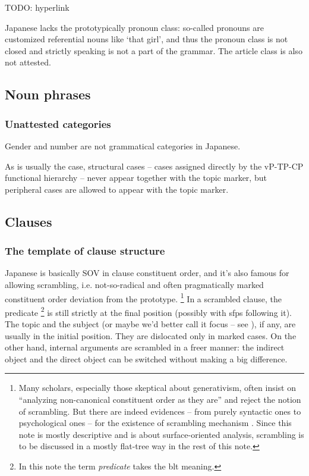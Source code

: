 \documentclass[UTF8, a4paper, oneside, scheme=plain]{ctexart}
\newcommand*{\term}[1]{\emph{#1}}
\newcommand{\translate}[1]{`#1'}
\begin{document}
TODO: hyperlink

Japanese lacks the prototypically pronoun class:
so-called pronouns are customized referential nouns like \translate{that girl},
and thus the pronoun class is not closed and strictly speaking is not a part of the grammar.
The article class is also not attested.

\subsection{Noun phrases}

\subsubsection{Unattested categories}

Gender and number are not grammatical categories in Japanese.



As is usually the case,
structural cases -- cases assigned directly by the vP-TP-CP functional hierarchy 
-- never appear together with the topic marker,
but peripheral cases are allowed to appear with the topic marker.

\subsection{Clauses}

\subsubsection{The template of clause structure}

Japanese is basically SOV in clause constituent order,
and it's also famous for allowing scrambling,
i.e. not-so-radical and often pragmatically marked constituent order deviation from the prototype.%
\footnote{
    Many scholars, especially those skeptical about generativism,
    often insist on ``analyzing non-canonical constituent order as they are''
    and reject the notion of scrambling.
    But there are indeed evidences -- from purely syntactic ones to psychological ones -- 
    for the existence of scrambling mechanism \citep{imamura2015effects,imamura2016processing,yatsushiro2003vp}.
    Since this note is mostly descriptive and is about surface-oriented analysis,
    scrambling is to be discussed in a mostly flat-tree way in the rest of this note.
}
In a scrambled clause, 
the predicate%
\footnote{
    In this note the term \term{predicate} takes the \ac{blt} meaning.
}
is still strictly at the final position 
(possibly with \acs{sfp}s following it).
The topic and the subject (or maybe we'd better call it focus -- see ), 
if any, are usually in the initial position.
They are dislocated only in marked cases.
On the other hand, 
internal arguments are scrambled in a freer manner:
the indirect object and the direct object can be switched without making a big difference.
\end{document}
